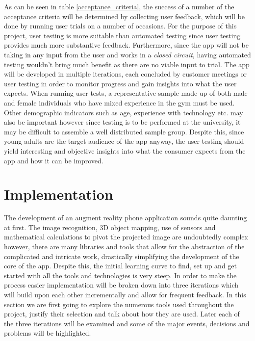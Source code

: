 \documentclass{l4proj}
\begin{document}
As can be seen in table \ref{acceptance_criteria}, the success of a number of the acceptance criteria will be determined by collecting user feedback, which will be done by running user trials on a number of occasions. For the purpose of this project, user testing is more suitable than automated testing since user testing provides much more substantive feedback. Furthermore, since the app will not be taking in any input from the user and works in a \textit{closed circuit}, having automated testing wouldn't bring much benefit as there are no viable input to trial. The app will be developed in multiple iterations, each concluded by customer meetings or user testing in order to monitor progress and gain insights into what the user expects.  When running user tests, a representative sample made up of both male and female individuals who have mixed experience in the gym must be used. Other demographic indicators such as age, experience with technology etc. may also be important however since testing is to be performed at the university, it may be difficult to assemble a well distributed sample group. Despite this, since young adults are the target audience of the app anyway, the user testing should yield interesting and objective insights into what the consumer expects from the app and how it can be improved. 


\chapter{Implementation}
The development of an augment reality phone application sounds quite daunting at first. The image recognition, 3D object mapping, use of sensors and mathematical calculations to pivot the projected image are undoubtedly complex however, there are many libraries and tools that allow for the abstraction of the complicated and intricate work, drastically simplifying the development of the core of the app. Despite this, the initial learning curve to find, set up and get started with all the tools and technologies is very steep. In order to make the process easier implementation will be broken down into three iterations which will build upon each other incrementally and allow for frequent feedback. In this section we are first going to explore the numerous tools used throughout the project, justify their selection and talk about how they are used. Later each of the three iterations will be examined and some of the major events, decisions and problems will be highlighted.
\end{document}
